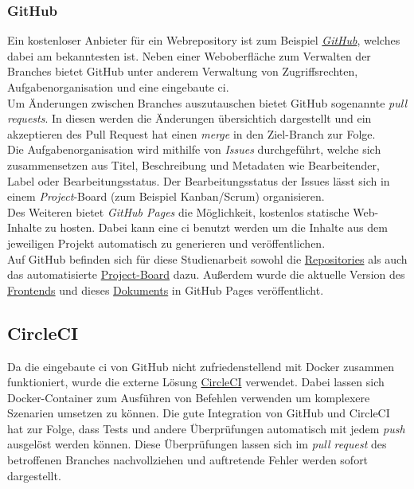\documentclass[12pt,twoside,a4paper]{article}
\begin{document}
\begin{sloppypar}
\subsubsection{GitHub}
Ein kostenloser Anbieter für ein Webrepository ist zum Beispiel \href{https://github.com/}{\textit{GitHub}}, welches dabei am bekanntesten ist. Neben einer Weboberfläche zum Verwalten der Branches bietet GitHub unter anderem Verwaltung von Zugriffsrechten, Aufgabenorganisation und eine eingebaute \acrshort{ci}.\\
Um Änderungen zwischen Branches auszutauschen bietet GitHub sogenannte \textit{pull requests}. In diesen werden die Änderungen übersichtich dargestellt und ein akzeptieren des Pull Request hat einen \textit{merge} in den Ziel-Branch zur Folge.\\
Die Aufgabenorganisation wird mithilfe von \textit{Issues} durchgeführt, welche sich zusammensetzen aus Titel, Beschreibung und Metadaten wie Bearbeitender, Label oder Bearbeitungsstatus. Der Bearbeitungsstatus der Issues lässt sich in einem \textit{Project}-Board (zum Beispiel Kanban/Scrum) organisieren.\\
Des Weiteren bietet \textit{GitHub Pages} die Möglichkeit, kostenlos statische Web-Inhalte zu hosten. Dabei kann eine \acrshort{ci} benutzt werden um die Inhalte aus dem jeweiligen Projekt automatisch zu generieren und veröffentlichen.\\
Auf GitHub befinden sich für diese Studienarbeit sowohl die \href{https://github.com/featherkraken}{Repositories} als auch das automatisierte \href{https://github.com/orgs/featherkraken/projects/1}{Project-Board} dazu. Außerdem wurde die aktuelle Version des \href{https://featherkraken.github.io/featherkraken-ui/}{Frontends} und dieses \href{https://featherkraken.github.io/featherkraken-paper/paper.pdf}{Dokuments} in GitHub Pages veröffentlicht.
\subsection{CircleCI}
Da die eingebaute \acrshort{ci} von GitHub nicht zufriedenstellend mit Docker zusammen funktioniert, wurde die externe Lösung \href{https://circleci.com/}{CircleCI} verwendet. Dabei lassen sich Docker-Container zum Ausführen von Befehlen verwenden um komplexere Szenarien umsetzen zu können. Die gute Integration von GitHub und CircleCI hat zur Folge, dass Tests und andere Überprüfungen automatisch mit jedem \textit{push} ausgelöst werden können. Diese Überprüfungen lassen sich im \textit{pull request} des betroffenen Branches nachvollziehen und auftretende Fehler werden sofort dargestellt.

\end{sloppypar}
\end{document}

